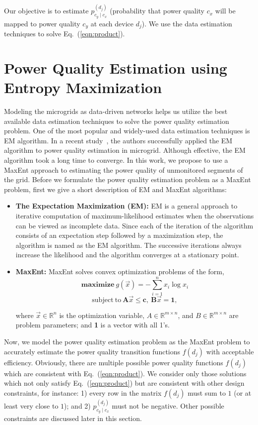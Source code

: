 Our objective is to estimate $p_{c_y \mid c_x}^{(d_j)}$ (probability that power quality $c_x$ will be mapped to power quality $c_y$ at each device $d_j$). We use the data estimation techniques to solve Eq.~(\ref{eqn:product}).

\section{Power Quality Estimation using Entropy Maximization}
\label{sec:formulation}
Modeling the microgrids as data-driven networks helps us utilize the best available data estimation techniques to solve the power quality estimation problem. One of the most popular and widely-used data estimation techniques is EM algorithm. In a recent study~\cite{catherine_pri}, the authors successfully applied the EM algorithm to power quality estimation in microgrid. Although effective, the EM algorithm took a long time to converge. In this work, we propose to use a MaxEnt approach to estimating the power quality of unmonitored segments of the grid. Before we formulate the power quality estimation problem as a MaxEnt problem, first we give a short description of EM and MaxEnt algorithms:

\begin{itemize}\itemsep0.7em
\item \textbf{The Expectation Maximization (EM):} EM is a general approach to iterative computation of maximum-likelihood estimates when the observations can be viewed as incomplete data. Since each of the iteration of the algorithm consists of an expectation step followed by a maximization step, the algorithm is named as the EM algorithm. The successive iterations always increase the likelihood and the algorithm converges at a stationary point.
\item \textbf{MaxEnt:} MaxEnt solves convex optimization problems of the form,
\[\mathrm{\mathbf{maximize}}~g(\vec{x}) = - \sum_{i=1}^n x_i \log x_i \]
\[\mathrm{subject~to~} \mathbf{A}\vec{x} \leq \mathbf{c},~ \mathbf{B}\vec{x} = \mathbf{1},\]

where $\vec{x}\in \mathbb{R}^n$ is the optimization variable, $A \in \mathbb{R}^{m \times n}$, and $B \in \mathbb{R}^{m \times n}$ are problem parameters;  and \textbf{1} is a vector with all 1's.
\end{itemize}

Now, we model the power quality estimation problem as the MaxEnt problem to accurately estimate the power quality transition functions $f(d_j)$ with acceptable efficiency. Obviously, there are multiple possible power quality functions $f(d_j)$ which are consistent with Eq.~(\ref{eqn:product}). We consider only those solutions which not only satisfy Eq.~(\ref{eqn:product}) but are consistent with other design constraints, for instance: 1) every row in the matrix $f(d_j)$ must sum to $1$ (or at least very close to $1$); and 2) $p_{c_y \mid c_x}^{(d_j)}$ must not be negative. Other possible constraints are discussed later in this section.

